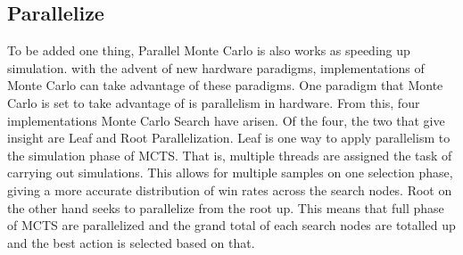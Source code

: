 \documentclass[12pt]{article}
\begin{document}
\subsection{Parallelize}
To be added one thing, Parallel Monte Carlo is also works as speeding up simulation. with the advent of new hardware paradigms, implementations of Monte Carlo can take advantage of these paradigms. One paradigm that Monte Carlo is set to take advantage of is parallelism in hardware. From this, four implementations Monte Carlo Search have arisen. Of the four, the two that give insight are Leaf and Root Parallelization.\cite{chaslot2008parallel} Leaf is one way to apply parallelism to the simulation phase of MCTS. That is, multiple threads are assigned the task of carrying out simulations. This allows for multiple samples on one selection phase, giving a more accurate distribution of win rates across the search nodes. Root on the other hand seeks to parallelize from the root up. This means that full phase of MCTS are parallelized and the grand total of each search nodes are totalled up and the best action is selected based on that. 



\end{document}
